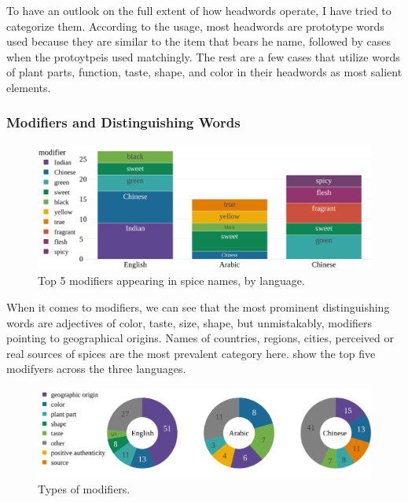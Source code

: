 To have an outlook on the full extent of how headwords operate, I have tried to categorize them. According to the usage, most headwords are prototype words used because they are similar to the item that bears he name, followed by cases when the protoytpeis used matchingly. The rest are a few cases that utilize words of plant parts, function, taste, shape, and color in their headwords as most salient elements.




\subsubsection{Modifiers and Distinguishing Words}

\begin{figure}[ht!]
  \includegraphics[width=\linewidth]{imgs/plots/modifier_bar.pdf}
  \caption{Top 5 modifiers appearing in spice names, by language.}
  \label{fig:modifier_bar}
\end{figure}

When it comes to modifiers, we can see that the most prominent distinguishing words are adjectives of color, taste, size, shape, but unmistakably, modifiers pointing to geographical origins. Names of countries, regions, cities, perceived or real sources of spices are the most prevalent category here.  show the top five modifyers across the three languages. 


\begin{figure}[ht!]
  \includegraphics[width=\linewidth]{imgs/plots/modifier_type_tripie.pdf}
  \caption{Types of modifiers.}
  \label{fig:modifier_type_tripie}
\end{figure}

